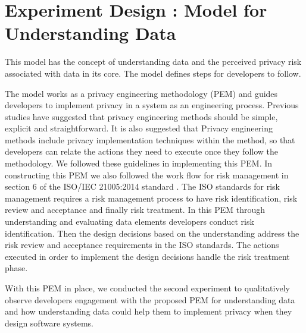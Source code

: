 \documentclass{sigchi}
\begin{document}
\section {Experiment Design : Model for Understanding Data}

This model has the concept of understanding data and the perceived privacy risk associated with data in its core. The model defines steps for developers to follow.



The model works as a privacy engineering methodology (PEM) and guides developers to implement privacy in a system as an engineering process. Previous studies have suggested that privacy engineering methods should be simple, explicit and straightforward. It is also suggested that Privacy engineering methods include privacy implementation techniques within the method, so that developers can relate the actions they need to execute once they follow the methodology. We followed these guidelines in implementing this PEM. In constructing this PEM we also followed the work flow for risk management in section 6 of the ISO/IEC 21005:2014 standard \cite {iso2014risk}. The ISO standards for risk management requires a risk management process to have risk identification, risk review and acceptance and finally risk treatment. In this PEM through understanding and evaluating data elements developers conduct risk identification. Then the design decisions based on the understanding address the risk review and acceptance requirements in the ISO standards. The actions executed in order to implement the design decisions handle the risk treatment phase.

With this PEM in place, we conducted the second experiment to qualitatively observe developers engagement with the proposed PEM for understanding data and how understanding data could help them to implement privacy when they design software systems.
\end{document}
